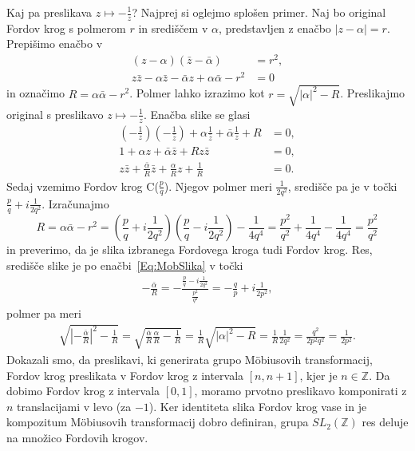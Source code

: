 \documentclass[mat1]{fmfdelo}
\begin{document}
\begin{dokaz}
Kaj pa preslikava $z \mapsto -\frac{1}{z}$? Najprej si oglejmo splošen primer. Naj bo original Fordov krog s polmerom $r$ in središčem v $\alpha$, predstavljen z enačbo $ |z-\alpha|=r$. Prepišimo enačbo v
\begin{align}
(z-\alpha)( \bar{z}-\bar{\alpha}) &= r^2, \nonumber \\
z\bar{z} - \alpha \bar{z} - \bar{\alpha} z + \alpha \bar{\alpha} - r^2 &= 0
\end{align}
in označimo $R = \alpha \bar{\alpha} - r^2$. Polmer lahko izrazimo kot $r = \sqrt{|\alpha|^2-R}$.
%
Preslikajmo original s preslikavo $z \mapsto -\frac{1}{z}$. Enačba slike se glasi
\begin{align}
\label{Eq:MobSlika}
\left(-\frac{1}{z}\right)\left(-\frac{1}{\bar{z}}\right) + \alpha \frac{1}{\bar{z}} + \bar{\alpha} \frac{1}{z} + R &= 0, \nonumber \\
1 + \alpha z + \bar{\alpha} \bar{z} + Rz \bar{z} &= 0, \nonumber \\
z \bar{z} + \frac{\bar{\alpha}}{R} \bar{z} + \frac{\alpha}{R} z + \frac{1}{R} &= 0.
\end{align}
%
Sedaj vzemimo Fordov krog C($\frac{p}{q}$). Njegov polmer meri $\frac{1}{2q^2}$, središče pa je v točki $\frac{p}{q} +i \frac{1}{2q^2}$.
Izračunajmo
\[ R = \alpha \bar{\alpha} - r^2 = \left(\frac{p}{q} + i\frac{1}{2q^2} \right) \left(\frac{p}{q} - i\frac{1}{2q^2} \right) - \frac{1}{4q^4} 
= \frac{p^2}{q^2} + \frac{1}{4q^4} - \frac{1}{4q^4} = \frac{p^2}{q^2} \]
in preverimo, da je slika izbranega Fordovega kroga tudi Fordov krog. Res, središče slike je po enačbi~\eqref{Eq:MobSlika} v točki
\begin{align}
-\frac{\bar{\alpha}}{R} = - \frac{\frac{p}{q} - i \frac{1}{2q^2}}{\frac{p^2}{q^2}} = - \frac{q}{p} + i \frac{1}{2p^2},
\end{align}
polmer pa meri
\begin{align}
\sqrt{ \left| - \frac{\bar{\alpha}}{R} \right|^2 - \frac{1}{R} } = \sqrt{ \frac{\bar{\alpha}}{R} \frac{\alpha}{R} - \frac{1}{R} } 
= \frac{1}{R} \sqrt{|\alpha|^2 - R} =  \frac{1}{R} \frac{1}{2q^2} = \frac{q^2}{2p^2 q^2} = \frac{1}{2p^2}.
\end{align}
%
Dokazali smo, da preslikavi, ki generirata grupo M\"{o}biusovih transformacij, Fordov krog preslikata v Fordov krog z intervala $[n,n+1]$, kjer je $n \in \mathbb{Z}$. Da dobimo Fordov krog z intervala $[0,1]$, moramo prvotno preslikavo komponirati z $n$ translacijami v levo (za $-1$). Ker identiteta slika Fordov krog vase in je kompozitum M\"{o}biusovih transformacij dobro definiran, grupa ${SL}_{2}(\mathbb{Z})$ res deluje na množico Fordovih krogov.
\end{dokaz}
\end{document}
